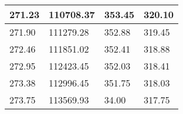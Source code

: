 \begin{table}[ht]
\begin{tabular}{|p{3cm}|p{3cm}|p{3cm}|p{3cm}|}
        271.23         & 110708.37       & 353.45              & 320.10              \\ \hline
        271.90         & 111279.28       & 352.88              & 319.45              \\ \hline
        272.46         & 111851.02       & 352.41              & 318.88              \\ \hline
        272.95         & 112423.45       & 352.03              & 318.41              \\ \hline
        273.38         & 112996.45       & 351.75              & 318.03              \\ \hline
        273.75         & 113569.93       & 34.00               & 317.75              \\ \hline
    \end{tabular}
\end{table}

